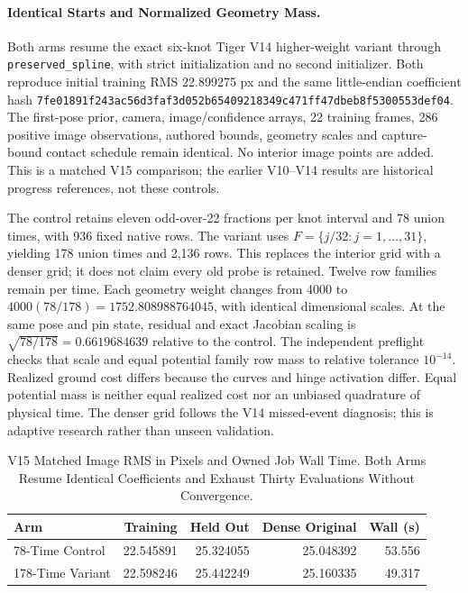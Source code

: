 \documentclass[11pt,letterpaper]{article}
\newcommand{\code}[1]{\nolinkurl{#1}}
\newcommand{\hash}[1]{{\footnotesize\nolinkurl{#1}}}
\begin{document}
\paragraph{Identical Starts and Normalized Geometry Mass.}
Both arms resume the exact six-knot Tiger V14 higher-weight variant through
\code{preserved\_spline}, with strict initialization and no second initializer.
Both reproduce initial training RMS 22.899275 px and the same little-endian
coefficient hash
\hash{7fe01891f243ac56d3faf3d052b65409218349c471ff47dbeb8f5300553def04}.
The first-pose prior, camera, image/confidence arrays, 22 training frames,
286 positive image observations, authored bounds, geometry scales and
capture-bound contact schedule remain identical. No interior image points
are added. This is a matched V15 comparison; the earlier V10--V14 results
are historical progress references, not these controls.

The control retains eleven odd-over-22 fractions per knot interval and 78
union times, with 936 fixed native rows. The variant uses
$F=\{j/32:j=1,\ldots,31\}$, yielding 178 union times and 2,136 rows.
This replaces the interior grid with a denser grid; it does not claim every
old probe is retained. Twelve row families remain per time. Each geometry
weight changes from 4000 to
$4000(78/178)=1752.808988764045$, with identical dimensional scales. At the
same pose and pin state, residual and exact Jacobian scaling is
$\sqrt{78/178}=0.6619684639$ relative to the control. The independent preflight
checks that scale and equal potential family row mass to relative tolerance
$10^{-14}$. Realized ground cost differs because the curves and hinge
activation differ. Equal potential mass is neither equal realized cost nor
an unbiased quadrature of physical time. The denser grid follows the V14
missed-event diagnosis; this is adaptive research rather than unseen validation.

\begin{table}[htbp]
\centering\small
\begin{tabular}{@{}lrrrr@{}}
\toprule Arm & Training & Held Out & Dense Original & Wall (s)\\\midrule
78-Time Control & 22.545891 & 25.324055 & 25.048392 & 53.556\\
178-Time Variant & 22.598246 & 25.442249 & 25.160335 & 49.317\\
\bottomrule
\end{tabular}
\caption{V15 Matched Image RMS in Pixels and Owned Job Wall Time. Both Arms
Resume Identical Coefficients and Exhaust Thirty Evaluations Without Convergence.}
\end{table}
\end{document}
